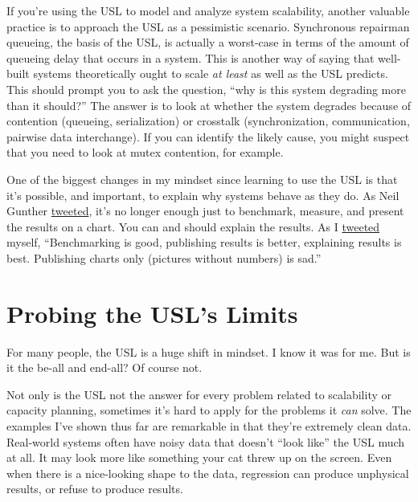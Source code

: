 \documentclass{vivid_layout}
\begin{document}
If you're using the USL to model and analyze system scalability, another
valuable practice is to approach the USL as a pessimistic scenario. Synchronous
repairman queueing, the basis of the USL, is actually a worst-case in terms of
the amount of queueing delay that occurs in a system. This is another way of
saying that well-built systems theoretically ought to scale {\itshape at least}
as well as the USL predicts. This should prompt you to ask the question, ``why
is this system degrading more than it should?'' The answer is to look at
whether the system degrades because of contention (queueing, serialization) or
crosstalk (synchronization, communication, pairwise data interchange). If you
can identify the likely cause, you might suspect that you need to look at mutex
contention, for example.

One of the biggest changes in my mindset since learning to use the USL is that
it's possible, and important, to explain why systems behave as they do. As Neil
Gunther \href{https://twitter.com/DrQz/status/659086348729499649}{tweeted}, it's
no longer enough just to benchmark, measure, and present the results on a chart.
You can and should explain the results. As I
\href{https://twitter.com/xaprb/status/657354190109458433}{tweeted} myself,
``Benchmarking is good, publishing results is better, explaining results is
best. Publishing charts only (pictures without numbers) is sad.''

\section{Probing the USL's Limits}

For many people, the USL is a huge shift in mindset. I know it was for me. But
is it the be-all and end-all? Of course not.

Not only is the USL not the answer for every problem related to scalability
or capacity planning, sometimes it's hard to apply for the problems it
{\itshape can} solve. The examples I've shown thus far are remarkable in that
they're extremely clean data. Real-world systems often have noisy data that
doesn't ``look like'' the USL much at all. It may look more like something your
cat threw up on the screen. Even when there is a nice-looking shape to the data,
regression can produce unphysical results, or refuse to produce results.
\end{document}

